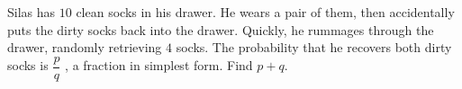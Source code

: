 Silas has $10$ clean socks in his drawer. He wears a pair of them, then accidentally puts the dirty socks back into the drawer. Quickly, he rummages through the drawer, randomly retrieving $4$ socks. The probability that he recovers both dirty socks is $\dfrac{p}{q}$ , a fraction in simplest form. Find $p + q$.
